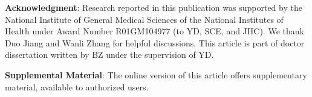 \documentclass[letterpaper,12pt]{article}
\begin{document}
\textbf{Acknowledgment}: Research reported in this publication was supported by the National Institute of General Medical Sciences of the National Institutes of Health under Award Number R01GM104977 (to YD, SCE, and JHC). We thank Duo Jiang and Wanli Zhang for helpful discussions. This article is part of doctor dissertation written by BZ under the supervision of YD. 

\textbf{Supplemental Material}: The online version of this article offers supplementary material,
available to authorized users.






%
%
\end{document}
